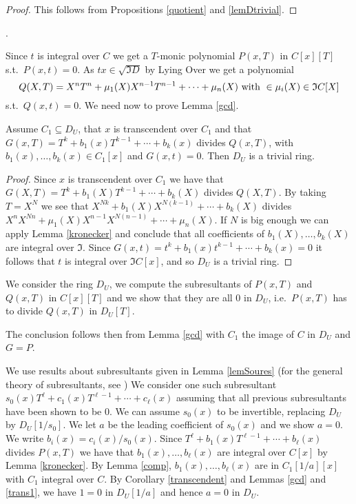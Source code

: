 \documentclass[11pt,a4paper,twoside]{article}
\newcommand{\gothic}{\mathfrak}
\newcommand{\fI}{{\gothic I}}
\begin{document}
\begin{proof}
This follows from Propositions \ref{quotient} and  \ref{lemDtrivial}.
\end{proof}


\medskip {}.



\noindent Since $t$ is integral over $C$ we get a $T$-monic polynomial $P(x,T)$ in $C[x][T]$ s.t.\ $P(x,t)=0$. As  $tx\in\sqrt{{\fI}D}$  by Lying Over
we get  a polynomial
$$Q(X,T) = X^nT^n + \mu_1(X) X^{n-1}T^{n-1} + \cdots + \mu_n(X) \hbox{ with }\in \mu_i(X)\in {\fI}C[X]$$ 
s.t.\ $Q(x,t)=0$.
 We need now to prove Lemma \ref{gcd}.



\begin{lemma}\label{gcd}
Assume $C_1\subseteq D_U$, that $x$ is transcendent over $C_1$ and
that $G(x,T) = T^k + b_1(x) T^{k-1} + \cdots + b_k(x)$ divides $Q(x,T)$, with
$b_1(x),\dots,b_k(x)\in C_1[x]$ and $G(x,t) = 0$. Then $D_U$ is a trivial ring.
\end{lemma}

\begin{proof}
Since $x$ is transcendent over $C_1$ we have that 
$G(X,T) = T^k + b_1(X)T^{k-1} + \cdots + b_k(X)$ divides $Q(X,T)$.
By taking $T = X^N$ we see that 
$X^{Nk} + b_1(X)X^{N(k-1)} + \cdots + b_k(X)$ 
divides
$X^nX^{Nn} + \mu_1(X) X^{n-1}X^{N(n-1)} + \cdots + \mu_n(X)$.
If $N$ is big enough we can apply Lemma \ref{kronecker} and conclude
that all coefficients of $b_1(X),\dots,b_k(X)$ are integral over ${\fI}$.
Since $G(x,t)=t^k + b_1(x)t^{k-1} + \cdots + b_k(x) = 0$ it follows that $t$
is integral over ${\fI}C[x]$, and so $D_U$ is a trivial ring.
\end{proof}

\noindent  
We consider the ring $D_U$, we compute the subresultants of $P(x,T)$ and $Q(x,T)$ in $C[x][T]$ and we show
that they are all $0$ in $D_U$, i.e.\ $P(x,T)$ has to divide $Q(x,T)$ in $D_U[T]$. 

\noindent  
The conclusion follows then from Lemma \ref{gcd} with $C_1$ the image of $C$ in
$D_U$ and $G=P$. 


\noindent We use results about subresultants given in Lemma \ref{lemSoures}
(for the general theory of subresultants, see \cite[Chapter 4]{BPR})
We consider one such subresultant $s_0(x) T^\ell  + c_1(x) T^{\ell -1} + \cdots + c_\ell (x)$
assuming that all previous subresultants have been shown to be $0$. 
We can assume $s_0(x)$ to be invertible, replacing $D_U$ by $D_U[1/s_0]$.
We let $a$ be the leading coefficient of $s_0(x)$ and we show $a=0$.
We write $b_i(x) = c_i(x)/s_0(x)$. Since  $T^\ell  + b_1(x)T^{\ell -1} + \cdots + b_\ell (x)$ divides
$P(x,T)$ we have that $b_1(x),\dots,b_\ell (x)$ are integral over $C[x]$ by Lemma \ref{kronecker}. By 
Lemma \ref{comp},
$b_1(x),\dots,b_\ell (x)$ are in $C_1[1/a][x]$ with $C_1$ integral over $C$. By
Corollary \ref{transcendent} and Lemmas \ref{gcd} and \ref{trans1}, we have $1=0$ in $D_U[1/a]$
and hence $a=0$ in $D_U$.
\end{document}
